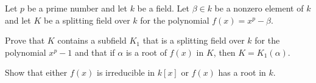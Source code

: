Let $p$ be a prime number and let $k$ be a field. Let $\beta\in k$ be
a nonzero element of $k$ and let $K$ be a splitting field over $k$ for
the polynomial $f(x)=x^p-\beta$.
\begin{alist}
\item Prove that $K$ contains a subfield $K_1$ that is a splitting 
field over $k$ for the polynomial $x^p-1$ and that if $\alpha$ is a
root of $f(x)$ in $K$, then $K=K_1(\alpha)$.
\item Show that either $f(x)$ is irreducible in $k[x]$ or $f(x)$ has
a root in $k$.
\end{alist}
